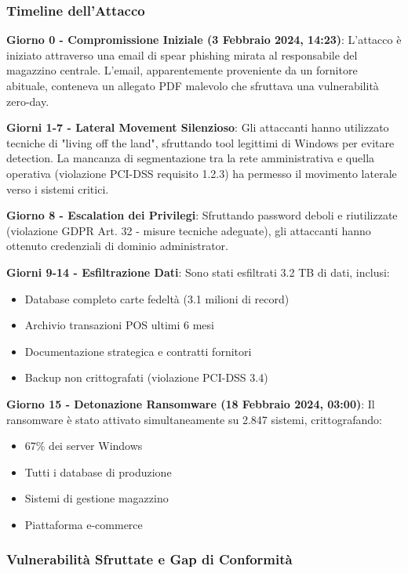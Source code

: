 \subsubsection{\texorpdfstring{Timeline dell'Attacco}{4.8.1.1 - Timeline dell'Attacco}}

\textbf{Giorno 0 - Compromissione Iniziale (3 Febbraio 2024, 14:23)}:
L'attacco è iniziato attraverso una email di spear phishing mirata al responsabile del magazzino centrale. L'email, apparentemente proveniente da un fornitore abituale, conteneva un allegato PDF malevolo che sfruttava una vulnerabilità zero-day.

\textbf{Giorni 1-7 - Lateral Movement Silenzioso}:
Gli attaccanti hanno utilizzato tecniche di "living off the land", sfruttando tool legittimi di Windows per evitare detection. La mancanza di segmentazione tra la rete amministrativa e quella operativa (violazione PCI-DSS requisito 1.2.3) ha permesso il movimento laterale verso i sistemi critici.

\textbf{Giorno 8 - Escalation dei Privilegi}:
Sfruttando password deboli e riutilizzate (violazione GDPR Art. 32 - misure tecniche adeguate), gli attaccanti hanno ottenuto credenziali di dominio administrator.

\textbf{Giorni 9-14 - Esfiltrazione Dati}:
Sono stati esfiltrati 3.2 TB di dati, inclusi:
\begin{itemize}
    \item Database completo carte fedeltà (3.1 milioni di record)
    \item Archivio transazioni POS ultimi 6 mesi
    \item Documentazione strategica e contratti fornitori
    \item Backup non crittografati (violazione PCI-DSS 3.4)
\end{itemize}

\textbf{Giorno 15 - Detonazione Ransomware (18 Febbraio 2024, 03:00)}:
Il ransomware è stato attivato simultaneamente su 2.847 sistemi, crittografando:
\begin{itemize}
    \item 67\% dei server Windows
    \item Tutti i database di produzione
    \item Sistemi di gestione magazzino
    \item Piattaforma e-commerce
\end{itemize}

\subsubsection{\texorpdfstring{Vulnerabilità Sfruttate e Gap di Conformità}{4.8.1.2 - Vulnerabilità Sfruttate e Gap di Conformità}}


